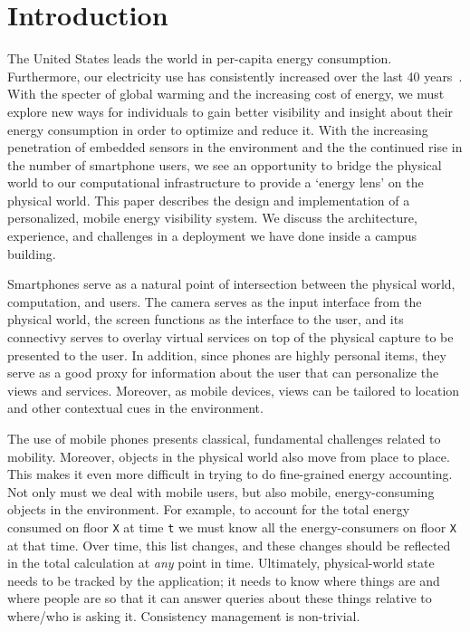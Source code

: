 \section{Introduction}
The United States leads the world in per-capita energy consumption.  Furthermore, 
our electricity use has consistently increased over the last 40 years~\cite{oecd2011}.
With the specter of global warming and the increasing cost of energy, we must explore new
ways for individuals to gain better visibility and insight about their energy consumption in order to optimize and reduce it. 
With the increasing penetration of embedded sensors in the environment and the
the continued rise in the number of smartphone users, we see an opportunity to bridge the physical world
to our computational infrastructure to provide a `energy lens' on the physical world.  This paper describes the design
and implementation of a personalized, mobile energy visibility system.  We discuss
the architecture, experience, and challenges in a deployment we have done inside a campus building.

Smartphones serve as a natural point of intersection between the physical world, computation, and users.  The camera serves as 
the input interface from the physical world, the screen functions as the
interface to the user, and its connectivy serves to overlay virtual services on top of the physical capture to be presented
to the user.  In addition, since phones are highly personal items, they serve as a good proxy for information about the user
that can personalize the views and services.  Moreover, as mobile devices, views can be tailored to location and other 
contextual cues in the environment.

The use of mobile phones presents classical, fundamental challenges related to mobility.  Moreover, objects in the physical world 
also move from place to place.  This makes it even more difficult in trying to do fine-grained energy accounting.  Not only must we
deal with mobile users, but also mobile, energy-consuming objects in the environment.  For example, to account for the total
energy consumed on floor {\tt X} at time {\tt t} we must know all the energy-consumers on floor {\tt X} at that time.  Over time, this list
changes, and these changes should be reflected in the total calculation at \emph{any} point in time.  Ultimately, physical-world state 
needs to be tracked by the application; it needs to know where things are and
where people are so that it can answer queries about these things relative to where/who is asking it.  Consistency management 
is non-trivial.

